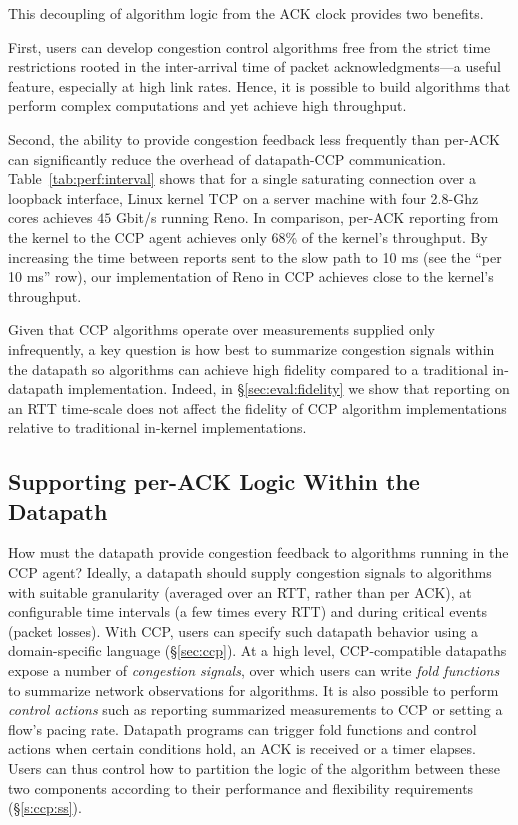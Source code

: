 This decoupling of algorithm logic from the ACK clock provides two benefits.

First, users can develop congestion control algorithms free from the strict
time restrictions rooted in the inter-arrival time of packet acknowledgments---a useful feature, especially at high link rates.
Hence, it is possible to build algorithms that perform complex computations and yet achieve high throughput.

Second, the ability to provide congestion feedback less frequently than per-ACK can significantly reduce the overhead of datapath-CCP communication.
Table~\ref{tab:perf:interval} shows that for a single saturating 
connection over a loopback interface, Linux kernel TCP on a server machine
with four 2.8-Ghz cores achieves $45$ Gbit/s running Reno.
In comparison, per-ACK reporting from the kernel to the CCP agent achieves
only 68\% of the kernel's throughput.
By increasing the time between reports sent to the slow path to 10 ms (see the
``per 10 ms'' row), our implementation of Reno in CCP achieves close to the kernel's throughput.

Given that CCP algorithms operate over measurements supplied only infrequently, a key question is how best to summarize congestion signals within the datapath so algorithms can achieve high fidelity compared to a traditional in-datapath implementation.
Indeed, in \S\ref{sec:eval:fidelity} we show that reporting on an RTT time-scale does not affect the fidelity of CCP algorithm implementations relative to traditional in-kernel implementations.

\subsection{Supporting per-ACK Logic Within the Datapath}
\label{sec:design:exercising-control-over-datapath}
\label{sec:design:restricted-datapath-functions}

How must the datapath provide congestion feedback to algorithms running in the CCP agent?
Ideally, a datapath should supply congestion signals to algorithms with suitable granularity (\eg averaged over an RTT, rather than per ACK), at configurable time intervals (\eg a few times every RTT) and during critical events (\eg packet losses).
With CCP, users can specify such datapath behavior using a domain-specific language (\S\ref{sec:ccp}). 
At a high level, CCP-compatible datapaths expose a number of {\em congestion signals}, over which users can write {\em fold functions} to summarize network observations for algorithms. 
It is also possible to perform \emph{control actions} such as reporting summarized measurements to CCP or setting a flow's pacing rate. 
Datapath programs can trigger fold functions and control actions when certain conditions hold, \eg an ACK is received or a timer elapses.
Users can thus control how to partition the logic of the algorithm between these two components according to their performance and flexibility requirements (\S\ref{s:ccp:ss}).